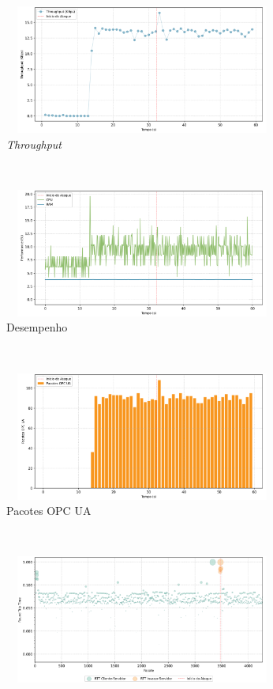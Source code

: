 \begin{apendicesenv}
\begin{figure}[htbp!]
    \centering
    \begin{subfigure}[t]{0.5\textwidth}
        \centering
        \includegraphics[width=1\textwidth, height=120pt]{USPSC-img/output/cropped/1-dos_certificate_inf_chain_loop-tput.png}
        \caption{\textit{Throughput}}
    \end{subfigure}%
    ~ 
    \begin{subfigure}[t]{0.5\textwidth}
        \centering
        \includegraphics[width=1\textwidth, height=120pt]{USPSC-img/output/cropped/1-dos_certificate_inf_chain_loop-perf.png}
        \caption{Desempenho}
    \end{subfigure}%
    \\
    \begin{subfigure}[t]{0.5\textwidth}
        \centering
        \includegraphics[width=1\textwidth, height=120pt]{USPSC-img/output/cropped/1-dos_certificate_inf_chain_loop-pack.png}
        \caption{Pacotes OPC UA}
    \end{subfigure}%
    ~
    \begin{subfigure}[t]{0.5\textwidth}
        \centering
        \includegraphics[width=1\textwidth, height=120pt]{USPSC-img/output/cropped/1-dos_certificate_inf_chain_loop-rttp.png}

\end{subfigure}
\end{figure}
\end{apendicesenv}
